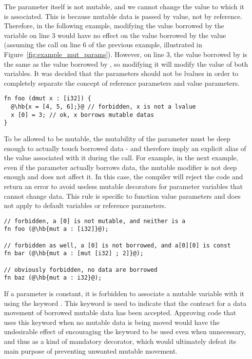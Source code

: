 

The parameter itself is not mutable, and we cannot change the value to which it
is associated. This is because mutable data is passed by value, not by
reference. Therefore, in the following example, modifying the value borrowed by
the variable  on line 3 would have no effect on the value borrowed by
the value  (assuming the call on line 6 of the previous example,
illustrated in Figure~\ref{fig:example_mut_params}). However, on line 3, the
value borrowed by  is the same as the value borrowed by , so
modifying it will modify the value of both variables. It was decided that the
parameters should not be lvalues in order to completely separate the concept of
reference parameters and value parameters.

\begin{lstlisting}[style=coloredverbatim, escapechar=@]
fn foo (dmut x : [i32]) {
  @\hb{x = [4, 5, 6];}@ // forbidden, x is not a lvalue
  x [0] = 3; // ok, x borrows mutable datas
}
\end{lstlisting}

To be allowed to be mutable, the mutability of the parameter must be deep enough
to actually touch borrowed data - and therefore imply an explicit alias of the
value associated with it during the call. For example, in the next example, even
if the parameter actually borrows data, the mutable modifier is not deep enough
and does not affect it. In this case, the compiler will reject the code and
return an error to avoid useless mutable decorators for parameter variables that
cannot change data. This rule is specific to function value parameters and does
not apply to default variables or reference parameters.

\begin{lstlisting}[style=coloredverbatim, escapechar=@]
// forbidden, a [0] is not mutable, and neither is a
fn foo (@\hb{mut a : [i32]}@);

// forbidden as well, a [0] is not borrowed, and a[0][0] is const
fn bar (@\hb{mut a : [mut [i32] ; 2]}@);

// obviously forbidden, no data are borrowed
fn baz (@\hb{mut a : i32}@);
\end{lstlisting}


If a parameter is constant, it is forbidden to associate a mutable variable with
it using the keyword . This keyword is used to indicate that the
contract for a data movement of borrowed mutable data has been accepted.
Approving code that uses this keyword when no mutable data is being moved would
have the undesirable effect of encouraging the keyword to be used even when
unnecessary, and thus as a kind of mandatory decorator, which would ultimately
defeat its main purpose of preventing unwanted mutable movement.

